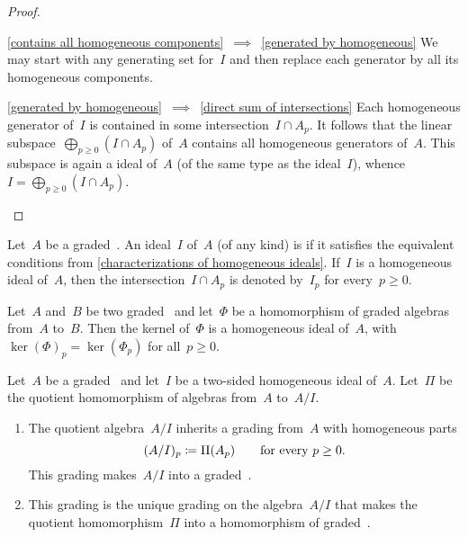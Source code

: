 \begin{proof}
\begin{enumerate}
\begin{implicationlist}
				\item[\ref*{contains all homogeneous components}~$\implies$~\ref*{generated by homogeneous}]
					We may start with any generating set for~$I$ and then replace each generator by all its homogeneous components.
				\item[\ref*{generated by homogeneous}~$\implies$~\ref*{direct sum of intersections}]
					Each homogeneous generator of~$I$ is contained in some intersection~$I \cap A_p$.
					It follows that the linear subspace~$\bigoplus_{p \geq 0} {} (I \cap A_p)$ of~$A$ contains all homogeneous generators of~$A$.
					This subspace is again a ideal of~$A$ (of the same type as the ideal~$I$), whence~$I = \bigoplus_{p \geq 0} {} (I \cap A_p)$.
				\qedhere
			\end{implicationlist}
	\end{enumerate}
\end{proof}


\begin{definition}
	Let~$A$ be a graded~\algebra{$\kf$}.
	An ideal~$I$ of~$A$ (of any kind) is  if it satisfies the equivalent conditions from \cref{characterizations of homogeneous ideals}.
	If~$I$ is a homogeneous ideal of~$A$, then the intersection~$I \cap A_p$ is denoted by~$I_p$ for every~$p \geq 0$.
\end{definition}


\begin{example}
	Let~$A$ and~$B$ be two graded~\algebras{$\kf$} and let~$\Phi$ be a homomorphism of graded algebras from~$A$ to~$B$.
	Then the kernel of~$\Phi$ is a homogeneous ideal of~$A$, with~$\ker(\Phi)_p = \ker( \Phi_p )$ for all~$p \geq 0$.
\end{example}


\begin{proposition}
	\label{construction of quotients of graded algebras}
	Let~$A$ be a graded~\algebra{$\kf$} and let~$I$ be a two-sided homogeneous ideal of~$A$.
	Let~$\Pi$ be the quotient homomorphism of algebras from~$A$ to~$A/I$.
	\begin{enumerate}
		\item
			The quotient algebra~$A/I$ inherits a grading from~$A$ with homogeneous parts
			\[
				(A/I)_p \coloneqq \Pi(A_p)
				\qquad
				\text{for every~$p \geq 0$.}
			\]
			This grading makes~$A/I$ into a graded~\algebra{$\kf$}.
		\item
			This grading is the unique grading on the algebra~$A/I$ that makes the quotient homomorphism~$\Pi$ into a homomorphism of graded~\algebras{$\kf$}.
	\end{enumerate}
\end{proposition}


